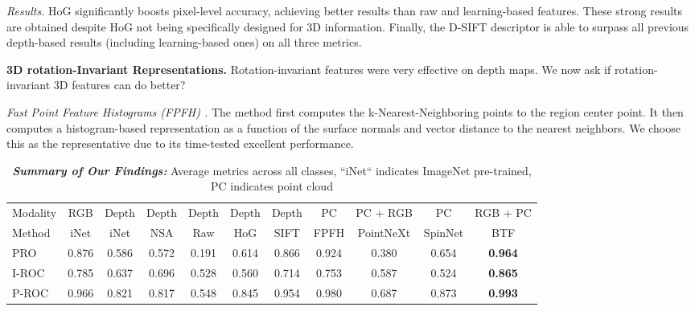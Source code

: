 \documentclass{article}
\begin{document}
\noindent \textit{Results.} HoG significantly boosts pixel-level accuracy, achieving better results than raw and learning-based features. These strong results are obtained despite HoG not being specifically designed for 3D information. Finally, the D-SIFT descriptor is able to surpass all previous depth-based results (including learning-based ones) on all three metrics. 


\noindent \textbf{3D rotation-Invariant Representations.} Rotation-invariant features were very effective on depth maps. We now ask if rotation-invariant 3D features can do better?

\noindent \textit{Fast Point Feature Histograms (FPFH) \cite{fpfh}.} The method first computes the k-Nearest-Neighboring points to the region center point. It then computes a histogram-based representation as a function of the surface normals and vector distance to the nearest neighbors. We choose this as the representative due to its time-tested excellent performance. 


\begin{table*}[t]
\begin{center}
\caption{\textit{\textbf{Summary of Our Findings:}} Average metrics across all classes, ``iNet`` indicates ImageNet pre-trained, PC indicates point cloud}
\label{table:3d_rep_summ}

\begin{tabular}{l@{\hskip5pt}|c@{\hskip5pt}c@{\hskip5pt}c@{\hskip5pt}c@{\hskip5pt}c@{\hskip5pt}c@{\hskip5pt}c@{\hskip5pt}c@{\hskip5pt}c@{\hskip5pt}c@{\hskip5pt}} 
    \toprule
    Modality & RGB & Depth & Depth & Depth & Depth & Depth & PC &  PC + RGB & PC & RGB + PC \\
    Method & iNet & iNet & NSA & Raw & HoG & SIFT & FPFH  & PointNeXt & SpinNet & BTF\\
    \midrule
    PRO & 0.876 & 0.586 & 0.572 & 0.191 & 0.614 & 0.866 & 0.924 &  0.380 & 0.654 &\textbf{0.964}\\
    I-ROC & 0.785 & 0.637 & 0.696 & 0.528 & 0.560 & 0.714 & 0.753 & 0.587 & 0.524 & \textbf{0.865}\\
    P-ROC & 0.966 & 0.821 & 0.817 & 0.548 & 0.845 & 0.954 & 0.980 &  0.687 & 0.873 &\textbf{0.993}\\
   \bottomrule
   
    \end{tabular}
    
\end{center}
\end{table*}
\end{document}
